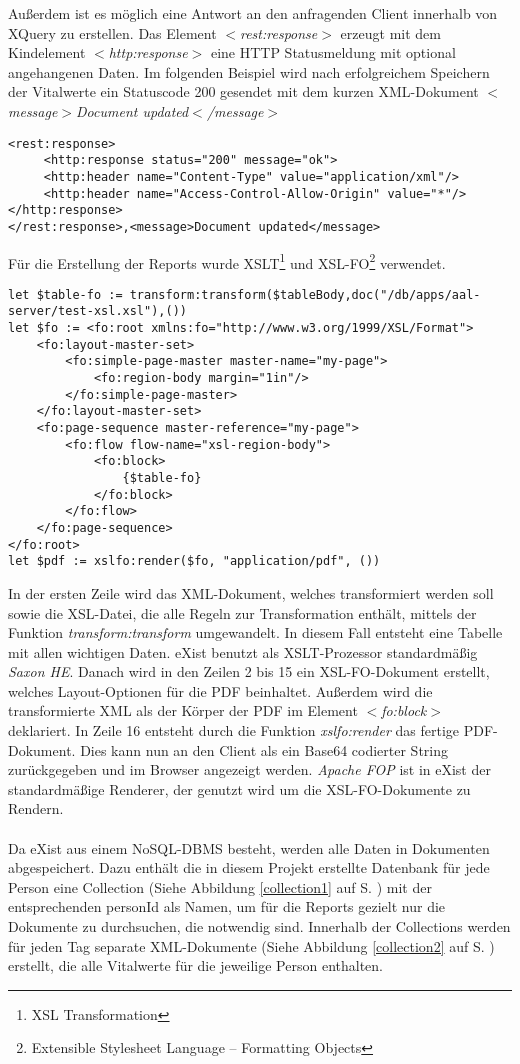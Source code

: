 Außerdem ist es möglich eine Antwort an den anfragenden Client innerhalb von XQuery zu erstellen. Das Element \textit{$<$rest:response$>$} erzeugt mit dem Kindelement \textit{$<$http:response$>$} eine HTTP Statusmeldung mit optional angehangenen Daten. Im folgenden Beispiel wird nach erfolgreichem Speichern der Vitalwerte ein Statuscode 200 gesendet mit dem kurzen XML-Dokument \textit{$<$message$>$Document updated$<$/message$>$}

\begin{lstlisting}
<rest:response>
     <http:response status="200" message="ok">
     <http:header name="Content-Type" value="application/xml"/>
     <http:header name="Access-Control-Allow-Origin" value="*"/>
</http:response>
</rest:response>,<message>Document updated</message>
\end{lstlisting}

Für die Erstellung der Reports wurde XSLT\footnote[1]{XSL Transformation} und XSL-FO\footnote[2]{Extensible Stylesheet Language – Formatting Objects} verwendet. 

\begin{lstlisting}
let $table-fo := transform:transform($tableBody,doc("/db/apps/aal-server/test-xsl.xsl"),())
let $fo := <fo:root xmlns:fo="http://www.w3.org/1999/XSL/Format">
    <fo:layout-master-set>
        <fo:simple-page-master master-name="my-page">
            <fo:region-body margin="1in"/>
        </fo:simple-page-master>
    </fo:layout-master-set>
    <fo:page-sequence master-reference="my-page">
        <fo:flow flow-name="xsl-region-body">
            <fo:block>
                {$table-fo}
            </fo:block>
        </fo:flow>
    </fo:page-sequence>
</fo:root>
let $pdf := xslfo:render($fo, "application/pdf", ())
\end{lstlisting}

In der ersten Zeile wird das XML-Dokument, welches transformiert werden soll sowie die XSL-Datei, die alle Regeln zur Transformation enthält, mittels der Funktion \textit{transform:transform} umgewandelt. In diesem Fall entsteht eine Tabelle mit allen wichtigen Daten. eXist benutzt als XSLT-Prozessor standardmäßig \textit{Saxon HE}. Danach wird in den Zeilen 2 bis 15 ein XSL-FO-Dokument erstellt, welches Layout-Optionen für die PDF beinhaltet. Außerdem wird die transformierte XML als der Körper der PDF im Element \textit{$<$fo:block$>$} deklariert. In Zeile 16 entsteht durch die Funktion \textit{xslfo:render} das fertige PDF-Dokument. Dies kann nun an den Client als ein Base64 codierter String zurückgegeben und im Browser angezeigt werden. \textit{Apache FOP} ist in eXist der standardmäßige Renderer, der genutzt wird um die XSL-FO-Dokumente zu Rendern. 
\\
\\
Da eXist aus einem NoSQL-DBMS besteht, werden alle Daten in Dokumenten abgespeichert. Dazu enthält die in diesem Projekt erstellte Datenbank für jede Person eine Collection (Siehe Abbildung \ref{collection1} auf S. \pageref{collection1}) mit der entsprechenden personId als Namen, um für die Reports gezielt nur die Dokumente zu durchsuchen, die notwendig sind. Innerhalb der Collections werden für jeden Tag separate XML-Dokumente (Siehe Abbildung \ref{collection2} auf S. \pageref{collection2}) erstellt, die alle Vitalwerte für die jeweilige Person enthalten.
